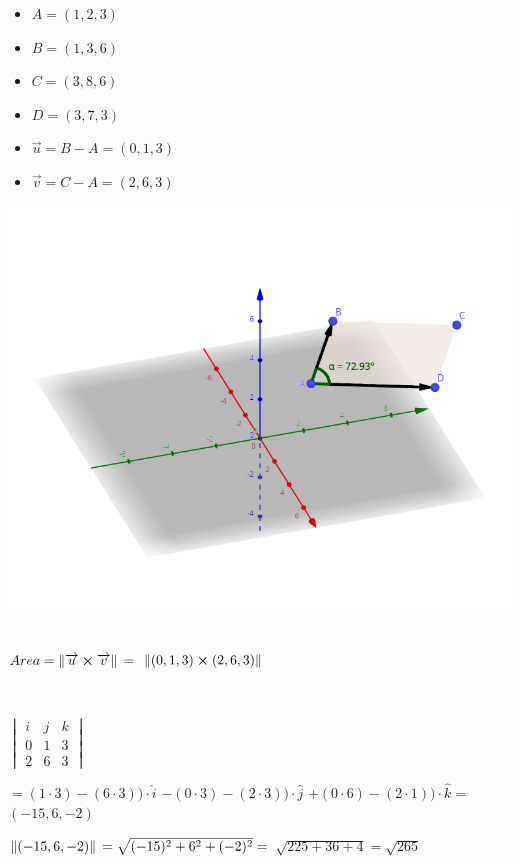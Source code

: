 \documentclass[../practica_01.tex]{subfiles}
\begin{document}
    \begin{itemize}
        \item $A = (1,2,3)$
        \item $B = (1,3,6)$
        \item $C = (3,8,6)$
        \item $D = (3,7,3)$
        \item $\overrightarrow{u} = B - A = (0,1,3) $
        \item $\overrightarrow{v} = C - A = (2,6,3) $
    \end{itemize}

    \includegraphics[scale=0.4]{ej12/resources/ej12.png} $ $

    $Area = \norm*{\overrightarrow{u} \cross \overrightarrow{v}} = $
    $\norm*{(0,1,3) \cross (2,6,3)}$

    $ $

    $\begin{vmatrix}
        i & j & k \\
        0 & 1 & 3 \\
        2 & 6 & 3
    \end{vmatrix}$

    $= (1 \cdot 3) - (6 \cdot 3)) \cdot \widehat{i}$
    $- (0 \cdot 3) - (2 \cdot 3)) \cdot \widehat{j}$
    $+ (0 \cdot 6) - (2 \cdot 1)) \cdot \widehat{k} = $
    $ (-15, 6, -2) $

    $\norm*{(-15, 6, -2)} = \sqrt{(-15)^2+6^2+(-2)^2} = $
    $\sqrt{225+36+4} = \sqrt{265} $
\end{document}

